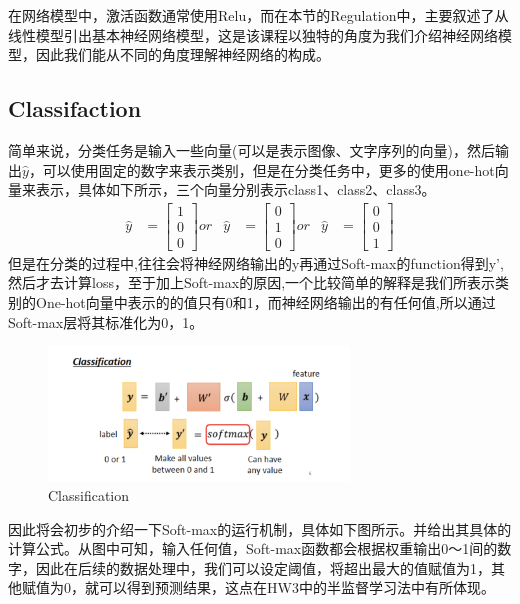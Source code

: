 \documentclass{article}
\begin{document}
\indent 在网络模型中，激活函数通常使用Relu，而在本节的Regulation中，主要叙述了从线性模型引出基本神经网络模型，这是该课程以独特的角度为我们介绍神经网络模型，因此我们能从不同的角度理解神经网络的构成。
\newpage

\subsection{Classifaction}
\indent 简单来说，分类任务是输入一些向量(可以是表示图像、文字序列的向量)，然后输出\( \hat{y} \)，可以使用固定的数字来表示类别，但是在分类任务中，更多的使用one-hot向量来表示，具体如下所示，三个向量分别表示class1、class2、class3。
\begin{align*}
    \hat{y}&=\begin{bmatrix}
            1\\
            0\\
            0
    \end{bmatrix} or  & 
    \hat{y}&=\begin{bmatrix} 
            0\\
            1\\
            0
    \end{bmatrix} or &
    \hat{y}&= \begin{bmatrix}
            0\\
            0\\
            1
    \end{bmatrix}
\end{align*}
\indent 但是在分类的过程中,往往会将神经网络输出的y再通过Soft-max的function得到y',然后才去计算loss，至于加上Soft-max的原因,一个比较简单的解释是我们所表示类别的One-hot向量中表示的的值只有0和1，而神经网络输出的有任何值,所以通过Soft-max层将其标准化为0，1。
\begin{figure}[H]
    \centering
    \includegraphics[width=8cm]{picture/Classify.png}
    \caption{Classification}
    \label{fig:galxy}
\end{figure}
\indent 因此将会初步的介绍一下Soft-max的运行机制，具体如下图所示。并给出其具体的计算公式。从图中可知，输入任何值，Soft-max函数都会根据权重输出0～1间的数字，因此在后续的数据处理中，我们可以设定阈值，将超出最大的值赋值为1，其他赋值为0，就可以得到预测结果，这点在HW3中的半监督学习法中有所体现。
\end{document}
